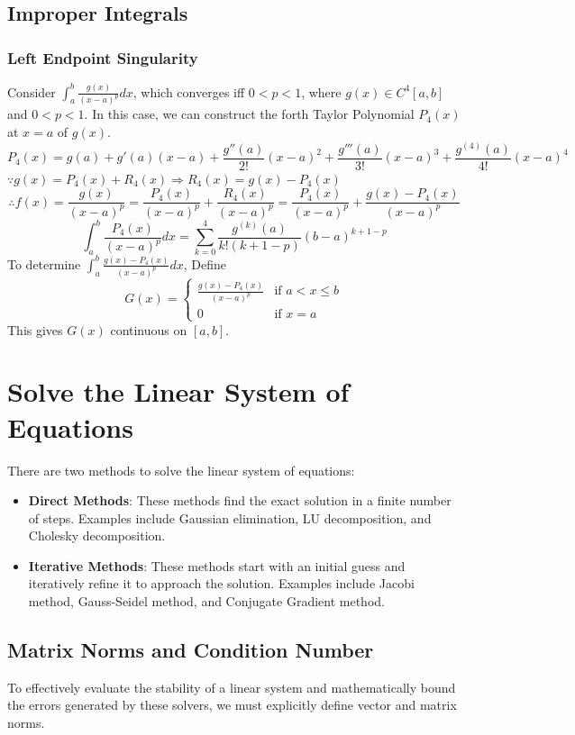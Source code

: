 \documentclass[12pt, a4paper]{article}
\theoremstyle{break}
\begin{document}
\subsection{Improper Integrals}
\subsubsection*{Left Endpoint Singularity}
Consider $\int_a^b \frac{g(x)}{(x-a)^p} dx$, which converges iff $0 < p < 1$, where $g(x) \in C^4[a,b]$ and $0 < p < 1$. In this case, we can construct the forth Taylor Polynomial $P_4(x)$ at $x=a$ of $g(x)$.
\[ P_4(x) = g(a) + g'(a)(x-a) + \frac{g''(a)}{2!}(x-a)^2 + \frac{g'''(a)}{3!}(x-a)^3 + \frac{g^{(4)}(a)}{4!}(x-a)^4 \]
$\because g(x) = P_4(x) + R_4(x) \Rightarrow R_4(x) = g(x) - P_4(x)$
\[ \therefore f(x) = \frac{g(x)}{(x-a)^p} = \frac{P_4(x)}{(x-a)^p} + \frac{R_4(x)}{(x-a)^p} = \frac{P_4(x)}{(x-a)^p} + \frac{g(x) - P_4(x)}{(x-a)^p} \]
\[ \int_a^b \frac{P_4(x)}{(x-a)^p} dx = \sum_{k=0}^4 \frac{g^{(k)}(a)}{k!(k+1-p)} (b-a)^{k+1-p} \]
To determine $\int_a^b \frac{g(x)-P_4(x)}{(x-a)^p} dx$, Define
\[ G(x) = \begin{cases} \frac{g(x)-P_4(x)}{(x-a)^p} & \text{if } a < x \le b \\ 0 & \text{if } x = a \end{cases} \]
This gives $G(x)$ continuous on $[a,b]$.

\section{Solve the Linear System of Equations}
There are two methods to solve the linear system of equations:
\begin{itemize}
    \item \textbf{Direct Methods}: These methods find the exact solution in a finite number of steps.
Examples include Gaussian elimination, LU decomposition, and Cholesky decomposition.
    \item \textbf{Iterative Methods}: These methods start with an initial guess and iteratively refine it to approach the solution.
Examples include Jacobi method, Gauss-Seidel method, and Conjugate Gradient method.
\end{itemize}

\subsection{Matrix Norms and Condition Number}
To effectively evaluate the stability of a linear system and mathematically bound the errors generated by these solvers, we must explicitly define vector and matrix norms.
\end{document}
